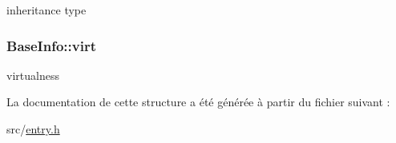 inheritance type 

\hypertarget{struct_base_info_ab32fa6c3344b6608768043f6ee5a8e6b}{}
\subsubsection[{virt}]{ Base\+Info\+::virt}\label{struct_base_info_ab32fa6c3344b6608768043f6ee5a8e6b}


virtualness 



La documentation de cette structure a été générée à partir du fichier suivant \+:\begin{DoxyCompactItemize}
\item 
src/\hyperlink{entry_8h}{entry.\+h}\end{DoxyCompactItemize}
